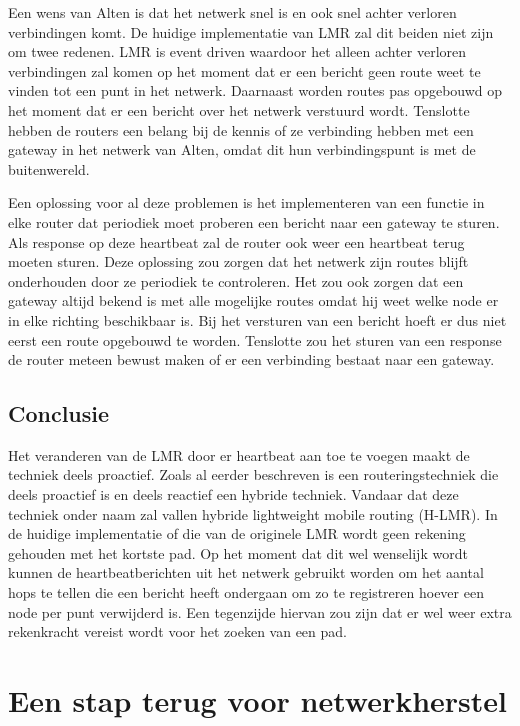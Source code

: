 \documentclass[a4paper, 11pt, oneside]{report}
\begin{document}
Een wens van Alten is dat het netwerk snel is en ook snel achter verloren verbindingen komt. 
De huidige implementatie van LMR zal dit beiden niet zijn om twee redenen.
LMR is event driven waardoor het alleen achter verloren verbindingen zal komen op het moment dat er een bericht geen route weet te vinden tot een punt in het netwerk.
Daarnaast worden routes pas opgebouwd op het moment dat er een bericht over het netwerk verstuurd wordt.
Tenslotte hebben de routers een belang bij de kennis of ze verbinding hebben met een gateway in het netwerk van Alten, omdat dit hun verbindingspunt is met de buitenwereld.

Een oplossing voor al deze problemen is het implementeren van een functie in elke router dat periodiek moet proberen een bericht naar een gateway te sturen. Als response op deze heartbeat zal de router ook weer een heartbeat terug moeten sturen.
Deze oplossing zou zorgen dat het netwerk zijn routes blijft onderhouden door ze periodiek te controleren.
Het zou ook zorgen dat een gateway altijd bekend is met alle mogelijke routes omdat hij weet welke node er in elke richting beschikbaar is. Bij het versturen van een bericht hoeft er dus niet eerst een route opgebouwd te worden.
Tenslotte zou het sturen van een response de router meteen bewust maken of er een verbinding bestaat naar een gateway.

\subsection{Conclusie}  

Het veranderen van de LMR door er heartbeat aan toe te voegen maakt de techniek deels proactief. 
Zoals al eerder beschreven is een routeringstechniek die deels proactief is en deels reactief een hybride techniek.
Vandaar dat deze techniek onder naam zal vallen hybride lightweight mobile routing (H-LMR).
In de huidige implementatie of die van de originele LMR wordt geen rekening gehouden met het kortste pad.
Op het moment dat dit wel wenselijk wordt kunnen de heartbeatberichten uit het netwerk gebruikt worden om het aantal hops te tellen die een bericht heeft ondergaan om zo te registreren hoever een node per punt verwijderd is. Een tegenzijde hiervan zou zijn dat er wel weer extra rekenkracht vereist wordt voor het zoeken van een pad.

\section{Een stap terug voor netwerkherstel}\label{sec:drone-aansturing-een-stap-terug-voor-netwerkherstel}
\end{document}
